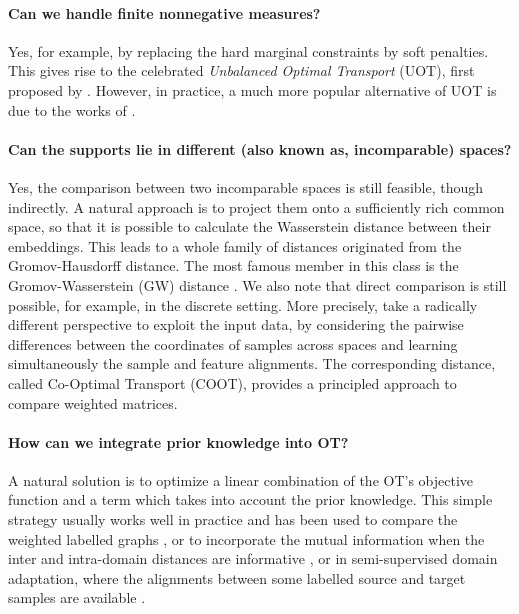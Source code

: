 \paragraph{Can we handle finite nonnegative measures?} Yes, for example,
by replacing the hard marginal constraints by soft penalties.
This gives rise to the celebrated \textit{Unbalanced Optimal Transport} (UOT), first proposed by
\citet{Benamou03}. However, in practice, a much more popular alternative of UOT
is due to the works of \citet{Liero18,Frogner15}.

\paragraph{Can the supports lie in different (also known as, incomparable) spaces?}
Yes, the comparison between two incomparable spaces is still feasible, though indirectly.
A natural approach is to project them onto a sufficiently rich common space,
so that it is possible to calculate the Wasserstein distance between their embeddings.
This leads to a whole family of distances originated from the Gromov-Hausdorff distance.
The most famous member in this class is the Gromov-Wasserstein (GW) distance \citep{Memoli07,Memoli11}.
We also note that direct comparison is still possible, for example, in the discrete setting.
More precisely, \citet{Redko20} take a radically different perspective
to exploit the input data, by considering the pairwise differences between the coordinates
of samples across spaces and learning simultaneously the sample and feature alignments.
The corresponding distance, called Co-Optimal Transport (COOT),
provides a principled approach to compare weighted matrices.

\paragraph{How can we integrate prior knowledge into OT?} A natural solution is to optimize
a linear combination of the OT's objective function and a term which takes into account the
prior knowledge. This simple strategy usually works well in practice and has been used to
compare the weighted labelled graphs \citep{Vayer19b}, or to incorporate the mutual information
when the inter and intra-domain distances are informative \citep{Chuang23},
or in semi-supervised domain adaptation, where the alignments between some labelled source
and target samples are available \citep{Courty16,Gu22}.


